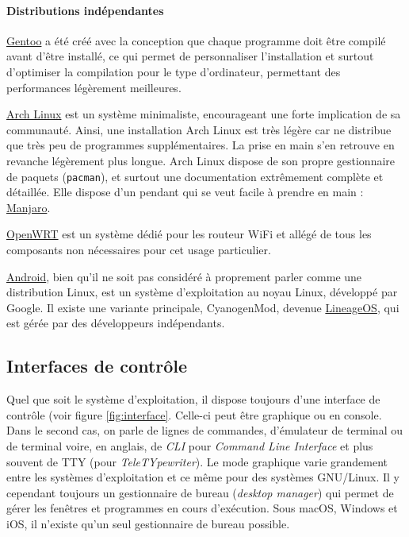 \paragraph{Distributions indépendantes}

\href{https://www.gentoo.org}{Gentoo} a été créé avec la conception que chaque programme doit être compilé avant d'être installé, ce qui permet de personnaliser l'installation et surtout d'optimiser la compilation pour le type d'ordinateur, permettant des performances légèrement meilleures.

\href{https://www.archlinux.org}{Arch Linux} est un système minimaliste, encourageant une forte implication de sa communauté. Ainsi, une installation Arch Linux est très légère car ne distribue que très peu de programmes supplémentaires. La prise en main s'en retrouve en revanche légèrement plus longue. Arch Linux dispose de son propre gestionnaire de paquets (\texttt{pacman}), et surtout une documentation extrêmement complète et détaillée. Elle dispose d'un pendant qui se veut facile à prendre en main : \href{https://manjaro.org}{Manjaro}.

\href{https://openwrt.org}{OpenWRT} est un système dédié pour les routeur WiFi et allégé de tous les composants non nécessaires pour cet usage particulier.

\href{https://www.android.com}{Android}, bien qu'il ne soit pas considéré à proprement parler comme une distribution Linux, est un système d'exploitation au noyau Linux, développé par Google. Il existe une variante principale, CyanogenMod, devenue \href{https://lineageos.org}{LineageOS}, qui est gérée par des développeurs indépendants.

\newpage

\subsection{Interfaces de contrôle}\vspace{-4mm}

Quel que soit le système d'exploitation, il dispose toujours d'une interface de contrôle (voir figure \ref{fig:interface}. Celle-ci peut être graphique ou en console. Dans le second cas, on parle de lignes de commandes, d'émulateur de terminal ou de terminal voire, en anglais, de \textit{CLI} pour \textit{Command Line Interface} et plus souvent de TTY (pour \textit{TeleTYpewriter}).
Le mode graphique varie grandement entre les systèmes d'exploitation et ce même pour des systèmes GNU/Linux. Il y cependant toujours un gestionnaire de bureau (\textit{desktop manager}) qui permet de gérer les fenêtres et programmes en cours d'exécution. Sous macOS, Windows et iOS, il n'existe qu'un seul gestionnaire de bureau possible.


